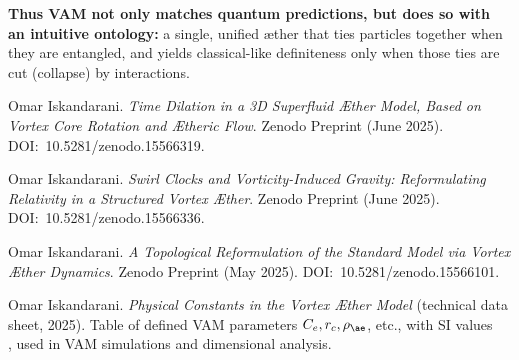 \documentclass[a4paper, aps,preprint,superscriptaddress, 12pt]{revtex4}
\begin{document}
\textbf{Thus VAM not only matches quantum predictions, but does so with an intuitive ontology:} a single, unified æther that ties particles together when they are entangled, and yields classical-like definiteness only when those ties are cut (collapse) by interactions.



\begin{thebibliography}{99}


 Omar Iskandarani. \textit{Time Dilation in a 3D Superfluid Æther Model, Based on Vortex Core Rotation and Ætheric Flow}. Zenodo Preprint (June 2025). DOI:~10.5281/zenodo.15566319.


 Omar Iskandarani. \textit{Swirl Clocks and Vorticity-Induced Gravity: Reformulating Relativity in a Structured Vortex Æther}. Zenodo Preprint (June 2025). DOI:~10.5281/zenodo.15566336.


 Omar Iskandarani. \textit{A Topological Reformulation of the Standard Model via Vortex Æther Dynamics}. Zenodo Preprint (May 2025). DOI:~10.5281/zenodo.15566101.


 Omar Iskandarani. \textit{Physical Constants in the Vortex Æther Model} (technical data sheet, 2025). Table of defined VAM parameters $C_e, r_c, \rho_{\ae}$, etc., with SI values~\cite{VAM_constants} ~\cite{VAM_constants} , used in VAM simulations and dimensional analysis.


\end{thebibliography}
\end{document}

